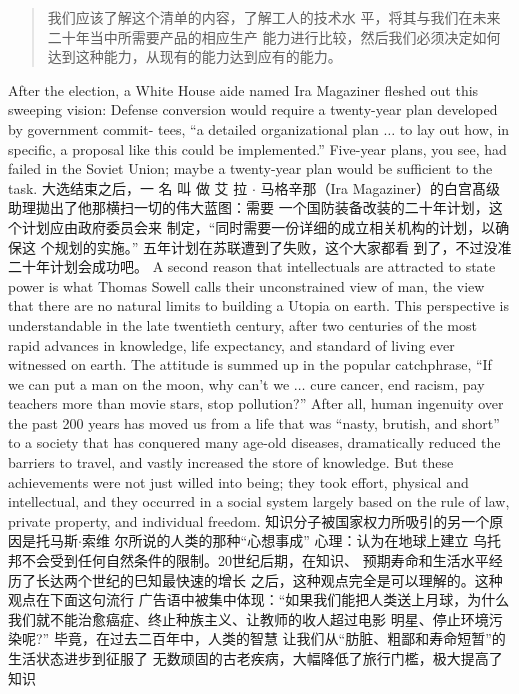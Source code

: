 \begin{paracol}{2}
\begin{quotation}
我们应该了解这个清单的内容，了解工人的技术水
平，将其与我们在未来二十年当中所需要产品的相应生产
能力进行比较，然后我们必须决定如何达到这种能力，从现有的能力达到应有的能力。
\end{quotation}
\switchcolumn*
After the election, a White House aide named Ira Magaziner
fleshed out this sweeping vision: Defense conversion would require a twenty-year plan developed by government commit-
tees, ``a detailed organizational plan $\ldots$ to lay out how, in
specific, a proposal like this could be implemented.'' Five-year
plans, you see, had failed in the Soviet Union; maybe a twenty-year plan would be sufficient to the task.
\switchcolumn
大选结束之后，一 名 叫 做 艾 拉 $\cdot$ 马格辛那（Ira Magaziner）的白宫髙级助理拋出了他那横扫一切的伟大蓝图：需要
一个国防装备改装的二十年计划，这个计划应由政府委员会来
制定，“同时需要一份详细的成立相关机构的计划，以确保这
个规划的实施。” 五年计划在苏联遭到了失败，这个大家都看
到了，不过没准二十年计划会成功吧。
\switchcolumn*
A second reason that intellectuals are attracted to state
power is what Thomas Sowell calls their unconstrained view of
man, the view that there are no natural limits to building a
Utopia on earth. This perspective is understandable in the late
twentieth century, after two centuries of the most rapid advances in knowledge, life expectancy, and standard of living
ever witnessed on earth. The attitude is summed up in the popular catchphrase, ``If we can put a man on the moon, why can't
we $\ldots$ cure cancer, end racism, pay teachers more than movie
stars, stop pollution?'' After all, human ingenuity over the past
200 years has moved us from a life that was ``nasty, brutish, and
short'' to a society that has conquered many age-old diseases,
dramatically reduced the barriers to travel, and vastly increased
the store of knowledge. But these achievements were not just
willed into being; they took effort, physical and intellectual,
and they occurred in a social system largely based on the rule of
law, private property, and individual freedom.
\switchcolumn
知识分子被国家权力所吸引的另一个原因是托马斯$\cdot$索维
尔所说的人类的那种“心想事成” 心理：认为在地球上建立
乌托邦不会受到任何自然条件的限制。20世纪后期，在知识、
预期寿命和生活水平经历了长达两个世纪的巳知最快速的增长
之后，这种观点完全是可以理解的。这种观点在下面这句流行
广告语中被集中体现：“如果我们能把人类送上月球，为什么
我们就不能治愈癌症、终止种族主义、让教师的收人超过电影
明星、停止环境污染呢?” 毕竟，在过去二百年中，人类的智慧
让我们从“肪脏、粗鄙和寿命短暂”的生活状态进步到征服了
无数顽固的古老疾病，大幅降低了旅行门檻，极大提高了知识

\end{paracol}
